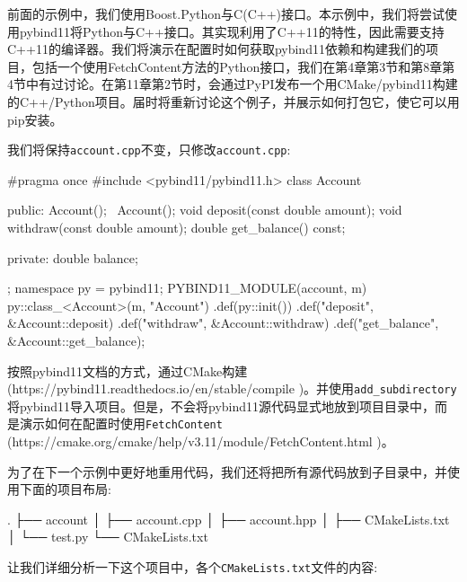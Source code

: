 前面的示例中，我们使用Boost.Python与C(C++)接口。本示例中，我们将尝试使用pybind11将Python与C++接口。其实现利用了C++11的特性，因此需要支持C++11的编译器。我们将演示在配置时如何获取pybind11依赖和构建我们的项目，包括一个使用FetchContent方法的Python接口，我们在第4章第3节和第8章第4节中有过讨论。在第11章第2节时，会通过PyPI发布一个用CMake/pybind11构建的C++/Python项目。届时将重新讨论这个例子，并展示如何打包它，使它可以用pip安装。


我们将保持\texttt{account.cpp}不变，只修改\texttt{account.cpp}:

\begin{codebox}[cpp]
#pragma once
#include <pybind11/pybind11.h>
class Account
{
public:
  Account();
  ~Account();
  void deposit(const double amount);
  void withdraw(const double amount);
  double get_balance() const;

private:
  double balance;
};
namespace py = pybind11;
PYBIND11_MODULE(account, m)
{
  py::class_<Account>(m, "Account")
      .def(py::init())
      .def("deposit", &Account::deposit)
      .def("withdraw", &Account::withdraw)
      .def("get_balance", &Account::get_balance);
}
\end{codebox}

按照pybind11文档的方式，通过CMake构建(https://pybind11.readthedocs.io/en/stable/compile )。并使用\texttt{add\_subdirectory}将pybind11导入项目。但是，不会将pybind11源代码显式地放到项目目录中，而是演示如何在配置时使用\texttt{FetchContent} (https://cmake.org/cmake/help/v3.11/module/FetchContent.html )。

为了在下一个示例中更好地重用代码，我们还将把所有源代码放到子目录中，并使用下面的项目布局:

\begin{codebox}[shell]
.
├── account
│    ├── account.cpp
│    ├── account.hpp
│    ├── CMakeLists.txt
│    └── test.py
└── CMakeLists.txt
\end{codebox}


让我们详细分析一下这个项目中，各个\texttt{CMakeLists.txt}文件的内容:

